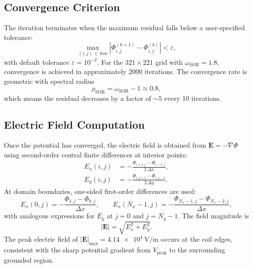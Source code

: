 \documentclass[11pt,a4paper]{report}
\newcommand{\dx}{\Delta x}
\newcommand{\dy}{\Delta y}
\begin{document}
\subsection{Convergence Criterion}

The iteration terminates when the maximum residual falls below a user-specified tolerance:
\begin{equation}
  \max_{(i,j)\,\in\,\text{free}}\!
  \left|\Phi_{i,j}^{(k+1)} - \Phi_{i,j}^{(k)}\right|
  < \varepsilon,
  \label{eq:m02-convergence}
\end{equation}
with default tolerance $\varepsilon = 10^{-2}$.  For the $321 \times 221$ grid with $\omega_\mathrm{SOR} = 1.8$, convergence is achieved in approximately 2000 iterations.  The convergence rate is geometric with spectral radius
\begin{equation}
  \rho_\mathrm{SOR} = \omega_\mathrm{SOR} - 1 \approx 0.8,
\end{equation}
which means the residual decreases by a factor of $\sim 5$ every 10 iterations.

\subsection{Electric Field Computation}

Once the potential has converged, the electric field is obtained from $\mathbf{E} = -\nabla\Phi$ using second-order central finite differences at interior points:
\begin{align}
  E_x(i,j) &= -\frac{\Phi_{i+1,j} - \Phi_{i-1,j}}{2\,\dx},
  \label{eq:m02-ex}\\
  E_y(i,j) &= -\frac{\Phi_{i,j+1} - \Phi_{i,j-1}}{2\,\dy}.
  \label{eq:m02-ey}
\end{align}
At domain boundaries, one-sided first-order differences are used:
\begin{equation}
  E_x(0,j) = -\frac{\Phi_{1,j} - \Phi_{0,j}}{\dx}, \qquad
  E_x(N_x{-}1,j) = -\frac{\Phi_{N_x-1,j} - \Phi_{N_x-2,j}}{\dx},
  \label{eq:m02-ex-boundary}
\end{equation}
with analogous expressions for $E_y$ at $j = 0$ and $j = N_y - 1$.  The field magnitude is
\begin{equation}
  |\mathbf{E}| = \sqrt{E_x^2 + E_y^2}.
  \label{eq:m02-emag}
\end{equation}
The peak electric field of $|\mathbf{E}|_\mathrm{max} = \SI{4.14e4}{\volt\per\meter}$ occurs at the coil edges, consistent with the sharp potential gradient from $V_\mathrm{peak}$ to the surrounding grounded region.
\end{document}

